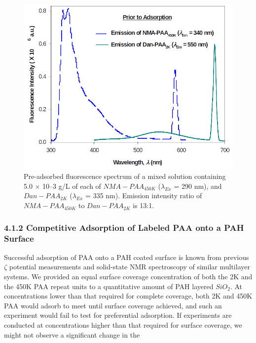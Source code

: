 \documentclass[journal=mamobx,manuscript=article]{achemso}
\begin{document}
\begin{figure}[H]
\includegraphics[scale=2.0]{fig3.png}
\caption{Pre-adsorbed fluorescence spectrum of a mixed solution containing 5.0 × 10–3 g/L of each of $NMA-PAA_{450K}$ ($\lambda_{Ex}$ = 290 nm), and $Dan-PAA_{2K}$ ($\lambda_{Ex}$ = 335 nm).  Emission intensity ratio of $NMA-PAA_{450K}$ to $Dan-PAA_{2K}$  is 13:1.}
\label{figure 3}
\end{figure}

\subsubsection{4.1.2 Competitive Adsorption of Labeled PAA onto a PAH Surface}

Successful adsorption of PAA onto a PAH coated surface is known from previous $\zeta$ potential measurements and solid-state NMR spectroscopy of similar multilayer systems.\cite{Burke2003,Smith2004}  We provided an equal surface coverage concentration of both the 2K and the 450K PAA repeat units to a quantitative amount of PAH layered $SiO_2$.  At concentrations lower than that required for complete coverage, both 2K and 450K PAA would adsorb to meet until surface coverage achieved, and such an experiment would fail to test for preferential adsorption.  If experiments are conducted at concentrations higher than that required for surface coverage, we might not observe a significant change in the 
\end{document}
